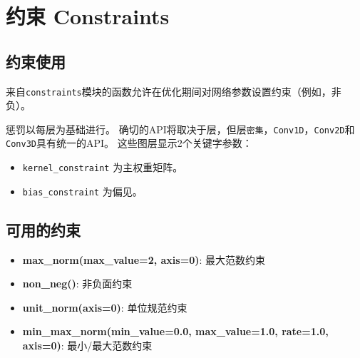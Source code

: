 \section{约束 Constraints}\label{constraints}
\subsection{约束使用}
来自\texttt{constraints}模块的函数允许在优化期间对网络参数设置约束（例如，非负）。

惩罚以每层为基础进行。
确切的API将取决于层，但层\texttt{密集}，\texttt{Conv1D}，\texttt{Conv2D}和\texttt{Conv3D}具有统一的API。
这些图层显示2个关键字参数：

\begin{itemize}
\tightlist
\item
  \texttt{kernel\_constraint} 为主权重矩阵。
\item
  \texttt{bias\_constraint} 为偏见。
\end{itemize}

\begin{Shaded}
\begin{Highlighting}[]
  
\OperatorTok{=}
\end{Highlighting}
\end{Shaded}

\subsection{可用的约束}\label{ux53efux7528ux7684ux7ea6ux675f}

\begin{itemize}
\tightlist
\item
  \textbf{max\_norm(max\_value=2, axis=0)}: 最大范数约束
\item
  \textbf{non\_neg()}: 非负面约束
\item
  \textbf{unit\_norm(axis=0)}: 单位规范约束
\item
  \textbf{min\_max\_norm(min\_value=0.0, max\_value=1.0, rate=1.0,
  axis=0)}: 最小/最大范数约束
\end{itemize}
\newpage
